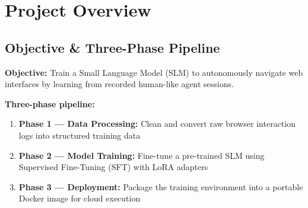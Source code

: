 

\newcommand{\modprefix}{d__4_thesis_lab_WebAgentExperiment_docs_notebooks_module_diagram_module_}
\newcommand{\modI}{\modprefix 1_browser_agent_components.png}
\newcommand{\modII}{\modprefix 2_raw_loader_components.png}
\newcommand{\modIII}{\modprefix 3_action_extractor_components.png}
\newcommand{\modIV}{\modprefix 4_operation_normalizer_components.png}
\newcommand{\modV}{\modprefix 5_candidate_builder_components.png}
\newcommand{\modVI}{\modprefix 6_html_generator_components.png}
\newcommand{\modVII}{\modprefix 7_action_repr_builder_components.png}
\newcommand{\modVIII}{\modprefix 8_trajectory_builder_components.png}

\section{Project Overview}

\subsection{Objective \& Three-Phase Pipeline}
\begin{frame}{\insertsubsection}
  \textbf{Objective:} Train a Small Language Model (SLM) to autonomously navigate
  web interfaces by learning from recorded human-like agent sessions.

  \vspace{0.3cm}
  \textbf{Three-phase pipeline:}
  \begin{enumerate}
    \item \textbf{Phase 1 --- Data Processing:} Clean and convert raw browser
          interaction logs into structured training data
    \item \textbf{Phase 2 --- Model Training:} Fine-tune a pre-trained SLM using
          Supervised Fine-Tuning (SFT) with LoRA adapters
    \item \textbf{Phase 3 --- Deployment:} Package the training environment into a
          portable Docker image for cloud execution
  \end{enumerate}
\end{frame}

